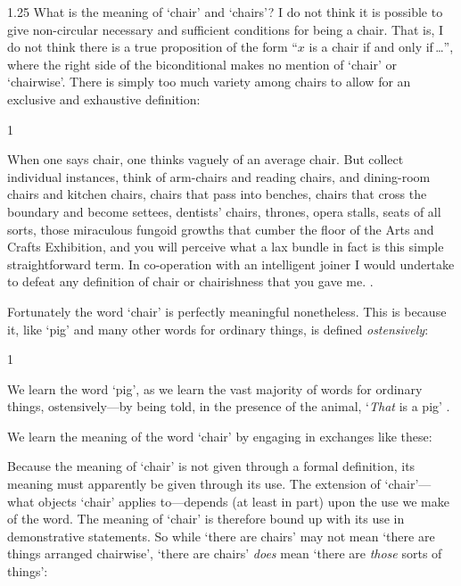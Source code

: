 \documentclass[11pt]{article}
\newenvironment{squote}{%
\begin{spacing}{1}
       	\begin{list}{}{%
\setlength{\labelwidth}{0pt}%
\rightmargin\leftmargin%
}
\item\relax
}{%
\end{list}%
\end{spacing}
}
\begin{document}
\begin{spacing}{1.25}
What is the meaning of `chair' and `chairs'?  I do not think it is
possible to give non-circular necessary and sufficient conditions for
being a chair.  That is, I do not think there is a true proposition of
the form ``$x$ is a chair if and only if\,\ldots '', where the right
side of the biconditional makes no mention of `chair' or `chairwise'.
There is simply too much variety among chairs to allow for an
exclusive and exhaustive definition:

\begin{squote}
When one says chair, one thinks vaguely of an average chair.  But
collect individual instances, think of arm-chairs and reading chairs,
and dining-room chairs and kitchen chairs, chairs that pass into
benches, chairs that cross the boundary and become settees, dentists'
chairs, thrones, opera stalls, seats of all sorts, those miraculous
fungoid growths that cumber the floor of the Arts and Crafts
Exhibition, and you will perceive what a lax bundle in fact is this
simple straightforward term.  In co-operation with an intelligent
joiner I would undertake to defeat any definition of chair or
chairishness that you gave me. \citep[384--385]{wells1904}.
\end{squote}

Fortunately the word `chair' is perfectly meaningful nonetheless.
This is because it, like `pig' and many other words for ordinary
things, is defined {\em ostensively}:

\begin{squote}
We learn the word `pig', as we learn the vast majority of words for
ordinary things, ostensively---by being told, in the presence of the
animal, `\emph{That} is a pig' \citep[121]{austin1964}.
\end{squote}

We learn the meaning of the word `chair' by engaging in exchanges like
these:



Because the meaning of `chair' is not given through a formal
definition, its meaning must apparently be given through its use.  The
extension of `chair'---what objects `chair' applies to---depends (at
least in part) upon the use we make of the word.  The meaning of
`chair' is therefore bound up with its use in demonstrative
statements.  So while `there are chairs' may not mean `there are
things arranged chairwise', `there are chairs' {\em does} mean `there
are {\em those} sorts of things':


\end{spacing}
\end{document}
